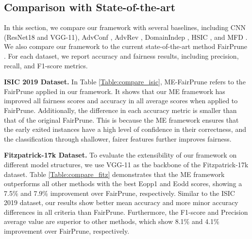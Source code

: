 
\subsection{Comparison with State-of-the-art}
\label{Compare_SOTA}


In this section, we compare our framework with several baselines, including CNN (ResNet18 and VGG-11), AdvConf \cite{alvi2018turning}, AdvRev \cite{zhang2018mitigating}, DomainIndep \cite{wang2020towards}, HSIC \cite{quadrianto2019discovering}, and MFD \cite{jung2021fair}. We also compare our framework to the current state-of-the-art method FairPrune \cite{wu2022fairprune}. For each dataset, we report accuracy and fairness results, including precision, recall, and F1-score metrics.

\textbf{ISIC 2019 Dataset.}
In Table \ref{Table:compare_isic}, ME-FairPrune refers to the FairPrune applied in our framework. It shows that our ME framework has improved all fairness scores and accuracy in all average scores when applied to FairPrune. Additionally, the difference in each accuracy metric is smaller than that of the original FairPrune. This is because the ME framework ensures that the early exited instances have a high level of confidence in their correctness, and the classification through shallower, fairer features further improves fairness. 

\textbf{Fitzpatrick-17k Dataset.}
To evaluate the extensibility of our framework on different model structures, we use VGG-11 as the backbone of the Fitzpatrick-17k dataset. Table \ref{Table:compare_fitz} demonstrates that the ME framework outperforms all other methods with the best Eopp1 and Eodd scores, showing a 7.5\% and 7.9\% improvement over FairPrune, respectively. Similar to the ISIC 2019 dataset, our results show better mean accuracy and more minor accuracy differences in all criteria than FairPrune. Furthermore, the F1-score and Precision average value are superior to other methods, which show 8.1\% and 4.1\% improvement over FairPrune, respectively.

